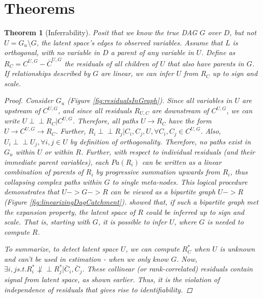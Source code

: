 \documentclass[letterpaper]{article}
\newtheorem{theorem}{Theorem}
\begin{document}
\section{Theorems}
\begin{theorem}[Inferrability]
\label{thm:inferrability}
Posit that we know the true DAG $G$ over $D$, but not $U = G_u \setminus G$, the latent space's edges to observed variables.  Assume that $L$ is orthogonal, with no variable in $D$ a parent of any variable in $U$. Define as $R_C = C^{U,G} - \bar{C}^{U,G}$ the residuals of all children of $U$ that also have parents in $G$.  If relationships described by $G$ are linear, we can infer $U$ from $R_C$ up to sign and scale.  

\begin{proof}
Consider $G_u$ (Figure \ref{fig:residualsInGraph}).  Since all variables in $U$ are upstream of $C^{U,G}$, and since all residuals $R_{U,C}$ are downstream of $C^{U,G}$, we can write $U \perp\!\!\!\perp R_C | C^{U,G}$.  Therefore, all paths $U \rightarrow R_C$ have the form $U \rightarrow C^{U,G} \rightarrow R_C$.  Further, $R_i \perp\!\!\!\perp R_j | C_i,C_j,U,   \forall C_i, C_j \in C^{U,G}$. Also, $U_i \perp\!\!\!\perp U_j, \forall i, j \in U$ by definition of orthogonality.  Therefore, no paths exist in $G_u$ within $U$ or within $R$.  Further, with respect to individual residuals (and their immediate parent variables), each $Pa(R_i)$ can be written as a linear combination of parents of $R_i$ by progressive summation upwards from $R_i$, thus collapsing complex paths within $G$ to single meta-nodes.  This logical procedure demonstrates that $U->G->R$ can be viewed as a bipartite graph $U->R$ (Figure \ref{fig:linearizingDagCatchment}).  \cite{anandkumar_learning_2013} showed that, if such a bipartite graph met the expansion property, the latent space of $R$ could be inferred up to sign and scale.  That is, starting with $G$, it is possible to infer $U$, where $G$ is needed to compute $R$.  

To summarize, to detect latent space $U$, we can compute $R^*_C$ when $U$ is unknown and can't be used in estimation - when we only know $G$.   Now, $\exists i, j s.t. R^*_i \not\perp\!\!\!\perp R^*_j | \bar{C}_i, \bar{C}_j$. These collinear (or rank-correlated) residuals contain signal from latent space, as shown earlier.  Thus, it is the violation of independence of residuals  that gives rise to identifiability. 
\end{proof}
\end{theorem}
\end{document}
